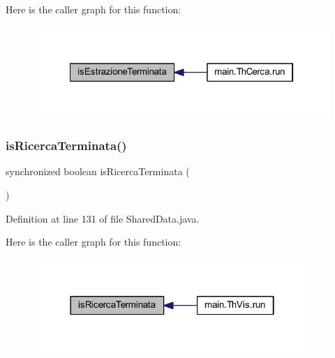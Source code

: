 Here is the caller graph for this function\+:
\nopagebreak
\begin{figure}[H]
\begin{center}
\leavevmode
\includegraphics[width=322pt]{classmain_1_1_shared_data_ae7e5f776048f84d07787d62c1ddcf7d0_icgraph}
\end{center}
\end{figure}
\mbox{\label{classmain_1_1_shared_data_a1cd83a707b62e4056055fd1c6ebba2b0}} 
\subsubsection{\texorpdfstring{is\+Ricerca\+Terminata()}{isRicercaTerminata()}}
{\footnotesize\ttfamily synchronized boolean is\+Ricerca\+Terminata (\begin{DoxyParamCaption}{ }\end{DoxyParamCaption})}



Definition at line 131 of file Shared\+Data.\+java.

Here is the caller graph for this function\+:
\nopagebreak
\begin{figure}[H]
\begin{center}
\leavevmode
\includegraphics[width=298pt]{classmain_1_1_shared_data_a1cd83a707b62e4056055fd1c6ebba2b0_icgraph}
\end{center}
\end{figure}
\mbox{\label{classmain_1_1_shared_data_a72a099def4ea0fd3499ed5b33a493245}} 
